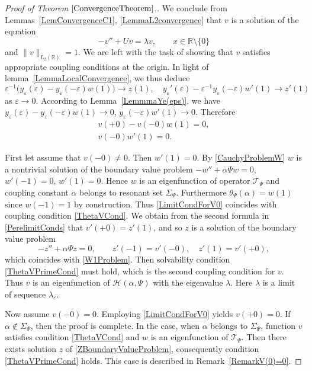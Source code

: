 \documentclass[11pt,english]{amsart}%
\begin{document}
\begin{proof}[Proof of  Theorem $\ref{ConvergenceTheorem}$.]
We conclude from Lemmas~\ref{LemConvergenceC1}, \ref{LemmaL2convergence} that  $v$ is a solution of the equation
\begin{equation*}
    -v''+Uv=\lambda v,\qquad x\in \mathbb{R}\setminus\{0\}
\end{equation*}
and $\|v\|_{L_2(\mathbb R)}=1$. We are left with the task of showing that $v$ satisfies appropriate coupling conditions at the origin.
In light of lemma~\ref{LemmaLocalConvergence}, we thus deduce
\begin{equation}\label{PerelimitConds}
    \varepsilon^{-1}\bigl(y_\varepsilon(\varepsilon)-y_\varepsilon(-\varepsilon)w(1)\bigl)\to z(1),\quad
    y_\varepsilon'(\varepsilon)-\varepsilon^{-1}y_\varepsilon(-\varepsilon)w'(1)\to z'(1)
\end{equation}
as $\varepsilon\to 0$. According to Lemma~\ref{LemmmaYe(eps)}, we have $y_\varepsilon(\varepsilon)-y_\varepsilon(-\varepsilon)w(1)\to 0$, $y_\varepsilon(-\varepsilon)w'(1)\to 0$. Therefore
\begin{gather}\label{LimitCondForV0}
    v(+0)-v(-0)w(1)=0,\\\label{LimitCondForV1}
    v(-0)w'(1)=0.
\end{gather}

First let assume that $v(-0)\neq 0$. Then $w'(1)=0$. By \eqref{CauchyProblemW}  $w$ is a nontrivial solution of the boundary value problem $-w''+\alpha\Psi w=0$, $w'(-1)=0$, $w'(1)=0$. Hence $w$ is an eigenfunction of operator $\mathcal{T}_\Psi$ and coupling constant $\alpha$ belongs to  resonant set $\Sigma_\Psi$. Furthermore $\theta_\Psi (\alpha)=w(1)$ since $w(-1)=1$ by construction. Thus \eqref{LimitCondForV0} coincides with coupling condition \eqref{ThetaVCond}. We obtain from the second formula in  \eqref{PerelimitConds} that $v'(+0)=z'(1)$, and so $z$ is a solution of the boundary value problem
\begin{equation}\label{ZBoundaryValueProblem}
    -z''+\alpha\Psi z=0,\qquad z'(-1)=v'(-0),\quad z'(1)=v'(+0),
\end{equation}
which coincides with \eqref{W1Problem}.
Then  solvability condition  \eqref{ThetaVPrimeCond} must hold, which is the second coupling condition for $v$.
Thus $v$ is an eigenfunction of $\mathcal{H}(\alpha,\Psi)$ with the eigenvalue $\lambda$. Here $\lambda$ is a limit of sequence $\lambda_\varepsilon$.

Now assume $v(-0)=0$. Employing \eqref{LimitCondForV0} yields $v(+0)=0$. If $\alpha\not\in \Sigma_\Psi$, then the proof is complete. In the case, when
$\alpha$ belongs to $\Sigma_\Psi$, function $v$ satisfies  condition \eqref{ThetaVCond}  and $w$  is an eigenfunction of  $\mathcal{T}_\Psi$. Then there exists  solution $z$  of \eqref{ZBoundaryValueProblem}, consequently
 condition \eqref{ThetaVPrimeCond} holds.
This case is described in Remark~\ref{RemarkV(0)=0}.
\end{proof}
\end{document}
